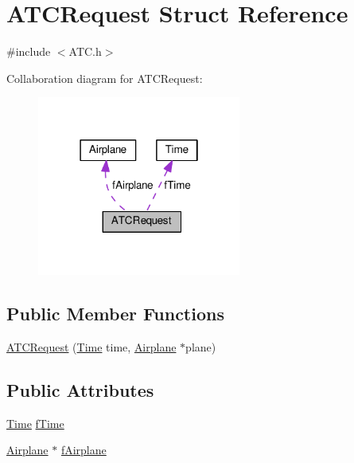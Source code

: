 \hypertarget{structATCRequest}{}\section{A\+T\+C\+Request Struct Reference}
\label{structATCRequest}


{\ttfamily \#include $<$A\+T\+C.\+h$>$}



Collaboration diagram for A\+T\+C\+Request\+:
\nopagebreak
\begin{figure}[H]
\begin{center}
\leavevmode
\includegraphics[width=190pt]{structATCRequest__coll__graph}
\end{center}
\end{figure}
\subsection*{Public Member Functions}
\begin{DoxyCompactItemize}
\item 
\hyperlink{structATCRequest_a26bd53c68bee460010bf80dc3c6dec12}{A\+T\+C\+Request} (\hyperlink{classTime}{Time} time, \hyperlink{classAirplane}{Airplane} $\ast$plane)
\end{DoxyCompactItemize}
\subsection*{Public Attributes}
\begin{DoxyCompactItemize}
\item 
\hyperlink{classTime}{Time} \hyperlink{structATCRequest_a6ef577c542082570fc934078994d622f}{f\+Time}
\item 
\hyperlink{classAirplane}{Airplane} $\ast$ \hyperlink{structATCRequest_a681215e14c24388ae811f182c33e4403}{f\+Airplane}
\end{DoxyCompactItemize}


